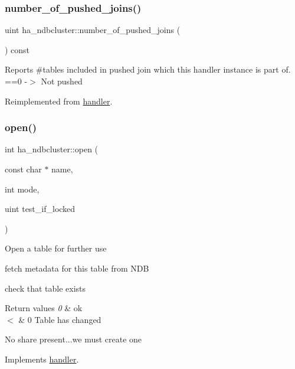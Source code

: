 \subsubsection{\texorpdfstring{number\+\_\+of\+\_\+pushed\+\_\+joins()}{number\_of\_pushed\_joins()}}
{\footnotesize\ttfamily uint ha\+\_\+ndbcluster\+::number\+\_\+of\+\_\+pushed\+\_\+joins (\begin{DoxyParamCaption}{ }\end{DoxyParamCaption}) const\hspace{0.3cm}{\ttfamily [virtual]}}

Reports \#tables included in pushed join which this handler instance is part of. ==0 -\/$>$ Not pushed 

Reimplemented from \mbox{\hyperlink{classhandler_a86930bf10b20ad19b3df07e07d28116e}{handler}}.

\mbox{\label{classha__ndbcluster_a5e1e0e1c8aa3764c955f46b8845b7a1a}} 
\subsubsection{\texorpdfstring{open()}{open()}}
{\footnotesize\ttfamily int ha\+\_\+ndbcluster\+::open (\begin{DoxyParamCaption}\item[{const char $\ast$}]{name,  }\item[{int}]{mode,  }\item[{uint}]{test\+\_\+if\+\_\+locked }\end{DoxyParamCaption})\hspace{0.3cm}{\ttfamily [virtual]}}

Open a table for further use
\begin{DoxyItemize}
\item fetch metadata for this table from N\+DB
\item check that table exists
\end{DoxyItemize}


\begin{DoxyRetVals}{Return values}
{\em 0} & ok \\
\hline
{\em $<$} & 0 Table has changed \\
\hline
\end{DoxyRetVals}
No share present...we must create one

Implements \mbox{\hyperlink{classhandler}{handler}}.

